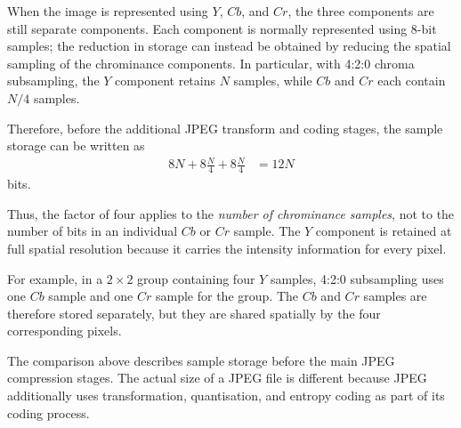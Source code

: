 When the image is represented using $Y$, $Cb$, and $Cr$, the three
components are still separate components. Each component is normally
represented using 8-bit samples; the reduction in storage can instead be
obtained by reducing the spatial sampling of the chrominance components.
In particular, with 4:2:0 chroma subsampling, the $Y$ component retains
$N$ samples, while $Cb$ and $Cr$ each contain $N/4$ samples.

Therefore, before the additional JPEG transform and coding stages, the
sample storage can be written as
\begin{align}
8N+8\frac{N}{4}+8\frac{N}{4}
&=12N\label{eq:ycbcr_420_storage_bits}
\end{align}
bits.

Thus, the factor of four applies to the \emph{number of chrominance
samples}, not to the number of bits in an individual $Cb$ or $Cr$ sample.
The $Y$ component is retained at full spatial resolution because it carries
the intensity information for every pixel.

For example, in a $2\times2$ group containing four $Y$ samples, 4:2:0
subsampling uses one $Cb$ sample and one $Cr$ sample for the group. The
$Cb$ and $Cr$ samples are therefore stored separately, but they are shared
spatially by the four corresponding pixels.

The comparison above describes sample storage before the main JPEG
compression stages. The actual size of a JPEG file is different because
JPEG additionally uses transformation, quantisation, and entropy coding
as part of its coding process.
